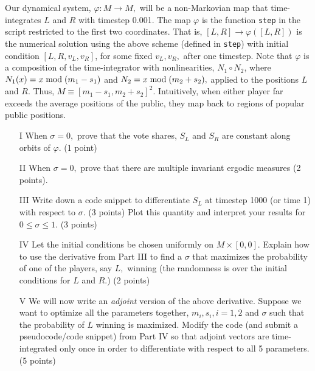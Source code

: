 \documentclass[12pt]{article}
\begin{document}
Our dynamical system, $\varphi: M \to M,$ will be a non-Markovian map that time-integrates $L$ and $R$ with timestep 0.001. The map $\varphi$ is the function \verb+step+ in the script restricted to the first two coordinates.
That is, $[L,R] \to \varphi([L, R])$ is the numerical solution using the above scheme (defined in \verb+step+) with initial condition $[L, R, v_L, v_R]$, for some fixed $v_L, v_R,$ after one timestep. 
Note that $\varphi$ is a composition of the time-integrator with nonlinearities, $N_1 \circ N_2$, where $N_1(x) = x \;{\rm mod}\; (m_1 - s_1)$ and $N_2 = x \;{\rm mod}\; (m_2 + s_2),$ applied to the positions 
$L$ and $R.$ Thus, $M \equiv [m_1-s_1, m_2+s_2]^2.$ Intuitively, when either player far exceeds the average positions of the public, they map back to regions of popular public positions.

\begin{enumerate}
	\item[I] When $\sigma =0,$ prove that the vote shares, $S_L$ and $S_R$ are constant along orbits of $\varphi.$
	 (1 point) 
	\item[II] When $\sigma = 0,$ prove that there are multiple invariant ergodic measures (2 points).
	\item[III] Write down a code snippet to differentiate $S_L$ at timestep 1000 (or time 1) with respect to $\sigma.$ (3 points) Plot this quantity and interpret your results for $0 \leq \sigma \leq 1.$ (3 points)
	\item[IV] Let the initial conditions be chosen uniformly on $M \times [0,0].$ Explain how to use the derivative from Part III to find a $\sigma$ that maximizes the probability of one of the players, say $L,$ winning (the randomness is over the initial conditions for $L$ and $R.$) (2 points)
	\item[V] We will now write an \emph{adjoint} version of the above derivative. Suppose we want to optimize all the parameters together, $m_i, s_i, i = 1,2$ and $\sigma$ such that 
	the probability of $L$ winning is maximized. Modify the code (and submit a pseudocode/code snippet) from Part IV so that adjoint vectors are time-integrated only once in order to differentiate with respect to all 5 parameters. (5 points)  
\end{enumerate} 
\end{document}
